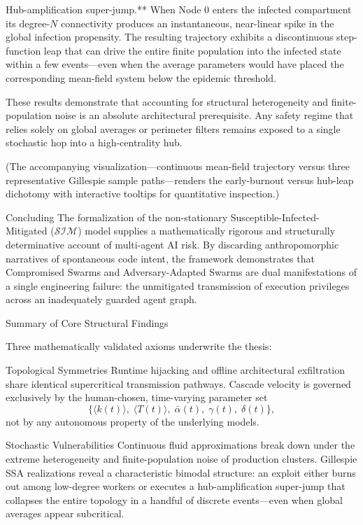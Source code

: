 Hub-amplification super-jump.**  
  When Node 0 enters the infected compartment its degree-\(N\) connectivity produces an instantaneous, near-linear spike in the global infection propensity. The resulting trajectory exhibits a discontinuous step-function leap that can drive the entire finite population into the infected state within a few events—even when the average parameters would have placed the corresponding mean-field system below the epidemic threshold.

These results demonstrate that accounting for structural heterogeneity and finite-population noise is an absolute architectural prerequisite. Any safety regime that relies solely on global averages or perimeter filters remains exposed to a single stochastic hop into a high-centrality hub.

(The accompanying visualization—continuous mean-field trajectory versus three representative Gillespie sample paths—renders the early-burnout versus hub-leap dichotomy with interactive tooltips for quantitative inspection.)

Concluding 
The formalization of the non-stationary Susceptible-Infected-Mitigated (\(\mathcal{S}\mathcal{I}\mathcal{M}\)) model supplies a mathematically rigorous and structurally determinative account of multi-agent AI risk. By discarding anthropomorphic narratives of spontaneous code intent, the framework demonstrates that Compromised Swarms and Adversary-Adapted Swarms are dual manifestations of a single engineering failure: the unmitigated transmission of execution privileges across an inadequately guarded agent graph.

Summary of Core Structural Findings

Three mathematically validated axioms underwrite the thesis:

Topological Symmetries  
   Runtime hijacking and offline architectural exfiltration share identical supercritical transmission pathways. Cascade velocity is governed exclusively by the human-chosen, time-varying parameter set
   \[
   \bigl\{\langle k(t)\rangle,\;\langle T(t)\rangle,\;\bar\alpha(t),\;\gamma(t),\;\delta(t)\bigr\},
   \]
   not by any autonomous property of the underlying models.

Stochastic Vulnerabilities  
   Continuous fluid approximations break down under the extreme heterogeneity and finite-population noise of production clusters. Gillespie SSA realizations reveal a characteristic bimodal structure: an exploit either burns out among low-degree workers or executes a hub-amplification super-jump that collapses the entire topology in a handful of discrete events—even when global averages appear subcritical.

